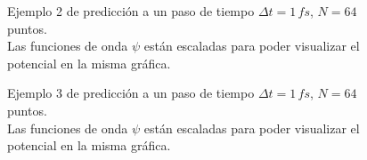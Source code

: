 \begin{figure}[H]
  \centering
  \caption{Ejemplo 2 de predicción a un paso de tiempo $\Delta t = 1\,fs$, $N=64$ puntos.\\ Las funciones de onda $\psi$ están escaladas para poder visualizar el potencial en la misma gráfica.}
  \label{fig:1step264}
\end{figure}

\begin{figure}[H]
  \centering
  \caption{Ejemplo 3 de predicción a un paso de tiempo $\Delta t = 1\,fs$, $N=64$ puntos.\\ Las funciones de onda $\psi$ están escaladas para poder visualizar el potencial en la misma gráfica.}
  \label{fig:1step364}
\end{figure}

